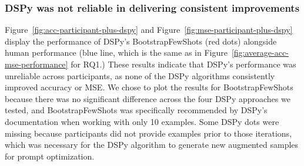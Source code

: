 \subsubsection{DSPy was not reliable in delivering consistent improvements}
Figure~\ref{fig:acc-participant-plus-dspy} and Figure~\ref{fig:mse-participant-plus-dspy} display the performance of DSPy's BootstrapFewShots (red dots) alongside human performance (blue line, which is the same as in Figure~\ref{fig:average-acc-mse-performance} for RQ1.)
These results indicate that DSPy's performance was unreliable across participants, as none of the DSPy algorithms consistently improved accuracy or MSE. 
We chose to plot the results for BootstrapFewShots because there was no significant difference across the four DSPy approaches we tested, and BootstrapFewShots was specifically recommended by DSPy's documentation when working with only 10 examples.
Some DSPy dots were missing because participants did not provide examples prior to those iterations, which was necessary for the DSPy algorithm to generate new augmented samples for prompt optimization. 










\begin{comment}





Figure~\ref{fig:acc-participant-plus-dspy} and Figure~\ref{fig:mse-participant-plus-dspy} show that DSPy performance is unstable as none of the DSPy algorithms consistently improve accuracy or MSE.
When comparing the improvement in prompt labeling accuracy and MSE among all participants, there is \textbf{no significant difference} within each model. 










In our study, in addition to relying entirely on users' judgements, we also experimented with DSPy, a framework for algorithmically optimizing LLM prompts, to attempt to improve human performance of the prompt.
DSPy can work with small set of user labeled data and abstract, generci initial prompt, which fit in the ``prompting in the dark'' scenario.
In particular, we experimented the following four approaches provided by DSPy:

Althought


, explored a wide range of prompt refinement algorithms provided in .\kenneth{Add citations}
W


a system designed to optimize prompt engineering for large language models (LLMs) by providing various teleprompters that refine prompts and examples based on user input and task requirements. 
Our goal was to identify the best-performing prompt for each user iteration, with a focus on optimizing for accuracy.


    
\end{comment}